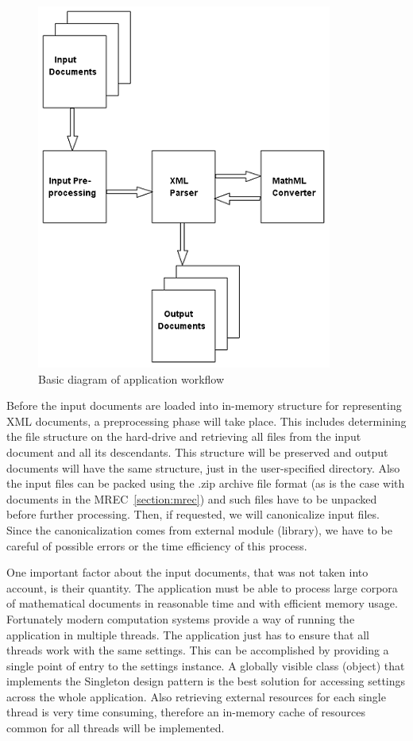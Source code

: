 \documentclass[11pt,oneside,final]{fithesis2}
\begin{document}
\begin{figure}[!ht]
\centering
\includegraphics{basic_diagram}
\caption{Basic diagram of application workflow}
\label{fig:basicworkflow}
\end{figure}

Before the input documents are loaded into in-memory structure for representing XML documents, a preprocessing phase will take place. This includes determining the file structure on the hard-drive and retrieving all files from the input document and all its descendants. This structure will be preserved and output documents will have the same structure, just in the user-specified directory. Also the input files can be packed using the .zip archive file format (as is the case with documents in the MREC~\ref{section:mrec}) and such files have to be unpacked before further processing. Then, if requested, we will canonicalize input files. Since the canonicalization comes from external module (library), we have to be careful of possible errors or the time efficiency of this process. 

One important factor about the input documents, that was not taken into account, is their quantity. The application must be able to process large corpora of mathematical documents in reasonable time and with efficient memory usage. Fortunately modern computation systems provide a way of running the application in multiple threads. The application just has to ensure that all threads work with the same settings. This can be accomplished by providing a single point of entry to the settings instance. A globally visible class (object) that implements the Singleton design pattern is the best solution for accessing settings across the whole application. Also retrieving external resources for each single thread is very time consuming, therefore an in-memory cache of resources common for all threads will be implemented.
\end{document}
